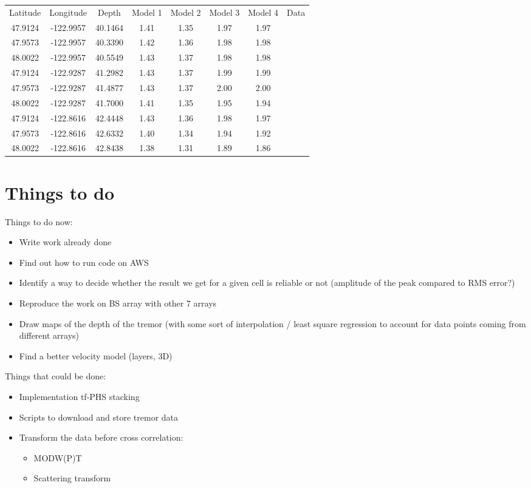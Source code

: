 \documentclass[workdone.tex]{subfiles}
\begin{document}
\begin{center}
\begin{tabular}{| c | c | c | c | c | c | c | c |}
  \hline
  Latitude & Longitude & Depth & Model 1 & Model 2 & Model 3 & Model 4 & Data \\
  47.9124 & -122.9957 & 40.1464 & 1.41 & 1.35 & 1.97 & 1.97 & \\
  47.9573 & -122.9957 & 40.3390 & 1.42 & 1.36 & 1.98 & 1.98 & \\
  48.0022 & -122.9957 & 40.5549 & 1.43 & 1.37 & 1.98 & 1.98 & \\
  47.9124 & -122.9287 & 41.2982 & 1.43 & 1.37 & 1.99 & 1.99 & \\
  47.9573 & -122.9287 & 41.4877 & 1.43 & 1.37 & 2.00 & 2.00 & \\
  48.0022 & -122.9287 & 41.7000 & 1.41 & 1.35 & 1.95 & 1.94 & \\
  47.9124 & -122.8616 & 42.4448 & 1.43 & 1.36 & 1.98 & 1.97 & \\
  47.9573 & -122.8616 & 42.6332 & 1.40 & 1.34 & 1.94 & 1.92 & \\
  48.0022 & -122.8616 & 42.8438 & 1.38 & 1.31 & 1.89 & 1.86 & \\
  \hline
\end{tabular}
\captionsetup{type=table}
\end{center}

\section{Things to do}

Things to do now:

\begin{itemize}
	\item Write work already done
	\item Find out how to run code on AWS
	\item Identify a way to decide whether the result we get for a given cell is reliable or not (amplitude of the peak compared to RMS error?)
	\item Reproduce the work on BS array with other 7 arrays
	\item Draw maps of the depth of the tremor (with some sort of interpolation / least square regression to account for data points coming from different arrays)
	\item Find a better velocity model (layers, 3D)
\end{itemize}

Things that could be done:

\begin{itemize}
	\item Implementation tf-PHS stacking
	\item Scripts to download and store tremor data
	\item Transform the data before cross correlation:
	\begin{itemize}
		\item MODW(P)T
		\item Scattering transform
	\end{itemize}
\end{itemize}
\end{document}
